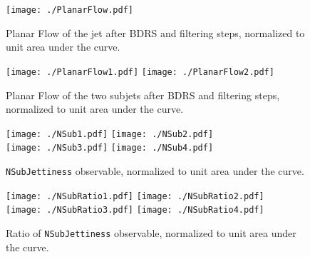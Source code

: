 \begin{figure}[H]
    \begin{center}
        \texttt{[image: ./PlanarFlow.pdf]}
        \caption{ Planar Flow of the jet after BDRS and filtering steps, normalized to unit area under the curve. }
        \label{fig:PlanarFlow}
    \end{center}
\end{figure}

\begin{figure}[H]
    \begin{center}
        \texttt{[image: ./PlanarFlow1.pdf]}
        \texttt{[image: ./PlanarFlow2.pdf]}\\
        \caption{ Planar Flow of the two subjets after BDRS and filtering steps, normalized to unit area under the curve. }
        \label{fig:PlanarFlowX}
    \end{center}
\end{figure}

\begin{figure}[H]
    \begin{center}
        \texttt{[image: ./NSub1.pdf]}
        \texttt{[image: ./NSub2.pdf]}\\
        \texttt{[image: ./NSub3.pdf]}
        \texttt{[image: ./NSub4.pdf]}\\
        \caption{ {\tt NSubJettiness} observable, normalized to unit area under the curve. }
        \label{fig:NSub}
    \end{center}
\end{figure}

\begin{figure}[H]
    \begin{center}
        \texttt{[image: ./NSubRatio1.pdf]}
        \texttt{[image: ./NSubRatio2.pdf]}\\
        \texttt{[image: ./NSubRatio3.pdf]}
        \texttt{[image: ./NSubRatio4.pdf]}\\
        \caption{ Ratio of {\tt NSubJettiness} observable, normalized to unit area under the curve. }
        \label{fig:NSubRatio}
    \end{center}
\end{figure}

